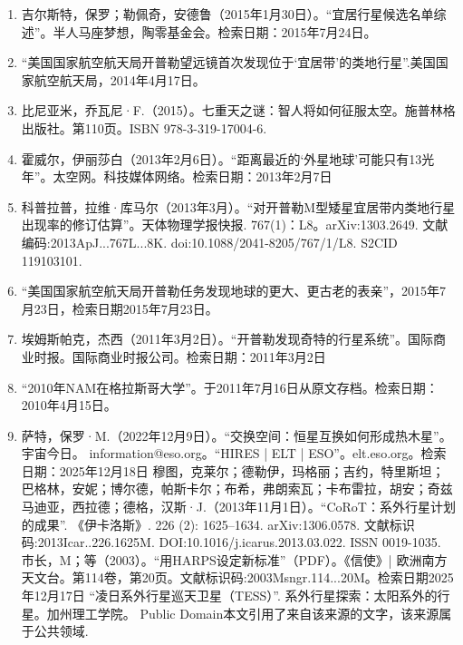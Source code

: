 \begin{enumerate}
\item 吉尔斯特，保罗；勒佩奇，安德鲁（2015年1月30日）。“宜居行星候选名单综述”。半人马座梦想，陶零基金会。检索日期：2015年7月24日。
\item “美国国家航空航天局开普勒望远镜首次发现位于‘宜居带’的类地行星”.美国国家航空航天局，2014年4月17日。
\item 比尼亚米，乔瓦尼·F.（2015）。七重天之谜：智人将如何征服太空。施普林格出版社。第110页。ISBN 978-3-319-17004-6.
\item 霍威尔，伊丽莎白（2013年2月6日）。“距离最近的‘外星地球’可能只有13光年”。太空网。科技媒体网络。检索日期：2013年2月7日
\item 科普拉普，拉维·库马尔（2013年3月）。“对开普勒M型矮星宜居带内类地行星出现率的修订估算”。天体物理学报快报. 767(1)：L8。arXiv:1303.2649. 文献编码:2013ApJ...767L...8K. doi:10.1088/2041-8205/767/1/L8. S2CID 119103101.
\item “美国国家航空航天局开普勒任务发现地球的更大、更古老的表亲”，2015年7月23日，检索日期2015年7月23日。
\item 埃姆斯帕克，杰西（2011年3月2日）。“开普勒发现奇特的行星系统”。国际商业时报。国际商业时报公司。检索日期：2011年3月2日
\item “2010年NAM在格拉斯哥大学”。于2011年7月16日从原文存档。检索日期：2010年4月15日。
\item 萨特，保罗·M.（2022年12月9日）。“交换空间：恒星互换如何形成热木星”。宇宙今日。
 information@eso.org。“HIRES | ELT | ESO”。elt.eso.org。检索日期：2025年12月18日
 穆图，克莱尔；德勒伊，玛格丽；吉约，特里斯坦；巴格林，安妮；博尔德，帕斯卡尔；布希，弗朗索瓦；卡布雷拉，胡安；奇兹马迪亚，西拉德；德格，汉斯·J.（2013年11月1日）。“CoRoT：系外行星计划的成果”. 《伊卡洛斯》. 226 (2): 1625–1634. arXiv:1306.0578. 文献标识码:2013Icar..226.1625M. DOI:10.1016/j.icarus.2013.03.022. ISSN 0019-1035.
 市长，M；等（2003）。“用HARPS设定新标准”（PDF）。《信使》| 欧洲南方天文台。第114卷，第20页。文献标识码:2003Msngr.114...20M。检索日期2025年12月17日
 “凌日系外行星巡天卫星（TESS）”. 系外行星探索：太阳系外的行星。加州理工学院。 Public Domain本文引用了来自该来源的文字，该来源属于公共领域.
 \end{enumerate}